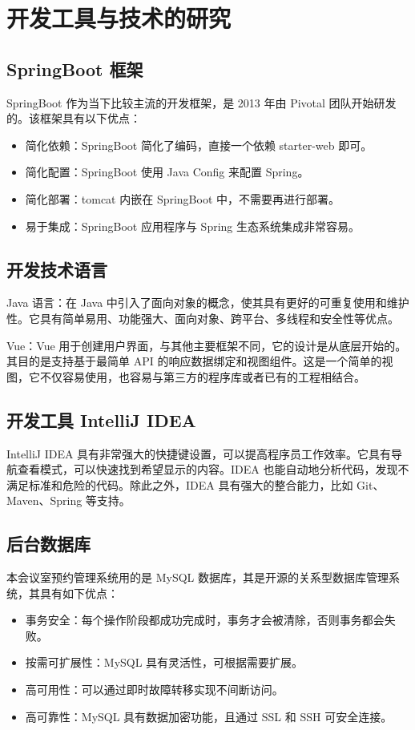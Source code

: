 \documentclass{izdthesis}
\begin{document}
\section{开发工具与技术的研究}
\subsection{SpringBoot 框架}
SpringBoot 作为当下比较主流的开发框架，是 2013 年由 Pivotal 团队开始研发的\cite{ref4}。该框架具有以下优点：
\begin{itemize}
  \item 简化依赖：SpringBoot 简化了编码，直接一个依赖 starter-web 即可。
  \item 简化配置：SpringBoot 使用 Java Config 来配置 Spring。
  \item 简化部署：tomcat 内嵌在 SpringBoot 中，不需要再进行部署。
  \item 易于集成：SpringBoot 应用程序与 Spring 生态系统集成非常容易。
\end{itemize}

\subsection{开发技术语言}
Java 语言：在 Java 中引入了面向对象的概念，使其具有更好的可重复使用和维护性。它具有简单易用、功能强大、面向对象、跨平台、多线程和安全性等优点\cite{ref5}。

Vue：Vue 用于创建用户界面，与其他主要框架不同，它的设计是从底层开始的。其目的是支持基于最简单 API 的响应数据绑定和视图组件。这是一个简单的视图，它不仅容易使用，也容易与第三方的程序库或者已有的工程相结合。

\subsection{开发工具 IntelliJ IDEA}
IntelliJ IDEA 具有非常强大的快捷键设置，可以提高程序员工作效率。它具有导航查看模式，可以快速找到希望显示的内容。IDEA 也能自动地分析代码，发现不满足标准和危险的代码。除此之外，IDEA 具有强大的整合能力，比如 Git、Maven、Spring 等支持。

\subsection{后台数据库}
本会议室预约管理系统用的是 MySQL 数据库，其是开源的关系型数据库管理系统，其具有如下优点\cite{ref6}：
\begin{itemize}
  \item 事务安全：每个操作阶段都成功完成时，事务才会被清除，否则事务都会失败。
  \item 按需可扩展性：MySQL 具有灵活性，可根据需要扩展。
  \item 高可用性：可以通过即时故障转移实现不间断访问。
  \item 高可靠性：MySQL 具有数据加密功能，且通过 SSL 和 SSH 可安全连接。
\end{itemize}
\end{document}
